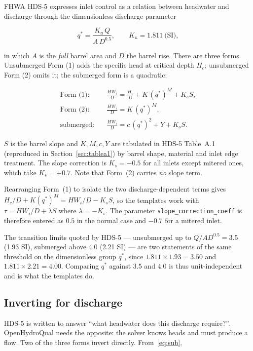 \documentclass[11pt,a4paper]{article}
\newcommand{\code}[1]{\texttt{\small #1}}
\begin{document}
FHWA HDS-5 expresses inlet control as a relation between headwater and
discharge through the dimensionless discharge parameter

\begin{equation}
q^{*}=\frac{K_u\,Q}{A\,D^{0.5}},\qquad K_u=1.811\ \text{(SI)},
\label{eq:qstar}
\end{equation}

\noindent
in which $A$ is the \emph{full} barrel area and $D$ the barrel rise. There are
three forms. Unsubmerged Form (1) adds the specific head at critical depth
$H_c$; unsubmerged Form (2) omits it; the submerged form is a quadratic:

\begin{align}
\text{Form (1):}\quad & \frac{HW_i}{D}=\frac{H_c}{D}+K\,(q^{*})^{M}+K_sS,
\label{eq:form1}\\
\text{Form (2):}\quad & \frac{HW_i}{D}=K\,(q^{*})^{M},
\label{eq:form2}\\
\text{submerged:}\quad & \frac{HW_i}{D}=c\,(q^{*})^{2}+Y+K_sS.
\label{eq:sub}
\end{align}

\noindent
$S$ is the barrel slope and $K,M,c,Y$ are tabulated in HDS-5 Table~A.1
(reproduced in Section~\ref{sec:tablea1}) by barrel shape, material and inlet
edge treatment. The slope correction is $K_s=-0.5$ for all inlets except mitered
ones, which take $K_s=+0.7$. Note that Form~(2) carries \emph{no} slope term.

Rearranging Form~(1) to isolate the two discharge-dependent terms gives
$H_c/D+K(q^{*})^{M}=HW_i/D-K_sS$, so the templates work with
$\tau=HW_i/D+\lambda S$ where $\lambda=-K_s$. The parameter
\code{slope\_correction\_coeff} is therefore entered as $0.5$ in the normal case
and $-0.7$ for a mitered inlet.

The transition limits quoted by HDS-5 --- unsubmerged up to $Q/AD^{0.5}=3.5$
(1.93 SI), submerged above $4.0$ (2.21 SI) --- are two statements of the same
threshold on the dimensionless group $q^{*}$, since $1.811\times1.93=3.50$ and
$1.811\times2.21=4.00$. Comparing $q^{*}$ against $3.5$ and $4.0$ is thus
unit-independent and is what the templates do.

\subsection{Inverting for discharge}

HDS-5 is written to answer ``what headwater does this discharge require?''.
OpenHydroQual needs the opposite: the solver knows heads and must produce a
flow. Two of the three forms invert directly. From~\eqref{eq:sub},
\end{document}
